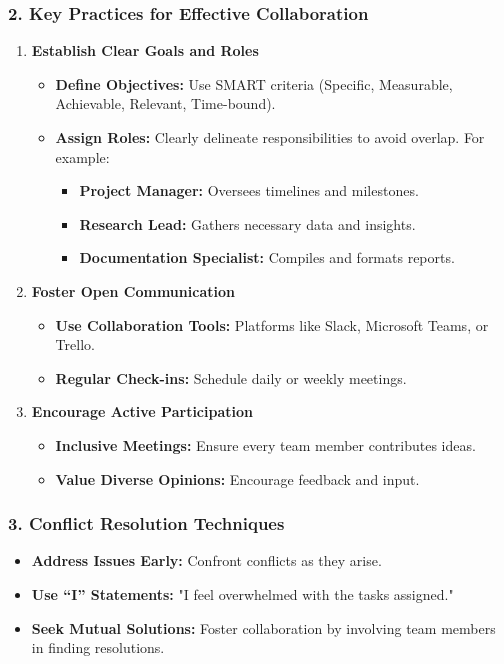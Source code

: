 \documentclass[aspectratio=169]{beamer}
\begin{document}
\begin{frame}[fragile]
    \frametitle{2. Key Practices for Effective Collaboration}
    \begin{enumerate}
        \item \textbf{Establish Clear Goals and Roles}
        \begin{itemize}
            \item \textbf{Define Objectives:} Use SMART criteria (Specific, Measurable, Achievable, Relevant, Time-bound).
            \item \textbf{Assign Roles:} Clearly delineate responsibilities to avoid overlap. For example:
            \begin{itemize}
                \item \textbf{Project Manager:} Oversees timelines and milestones.
                \item \textbf{Research Lead:} Gathers necessary data and insights.
                \item \textbf{Documentation Specialist:} Compiles and formats reports.
            \end{itemize}
        \end{itemize}

        \item \textbf{Foster Open Communication}
        \begin{itemize}
            \item \textbf{Use Collaboration Tools:} Platforms like Slack, Microsoft Teams, or Trello.
            \item \textbf{Regular Check-ins:} Schedule daily or weekly meetings.
        \end{itemize}

        \item \textbf{Encourage Active Participation}
        \begin{itemize}
            \item \textbf{Inclusive Meetings:} Ensure every team member contributes ideas.
            \item \textbf{Value Diverse Opinions:} Encourage feedback and input.
        \end{itemize}
    \end{enumerate}
\end{frame}

\begin{frame}[fragile]
    \frametitle{3. Conflict Resolution Techniques}
    \begin{itemize}
        \item \textbf{Address Issues Early:} Confront conflicts as they arise.
        \item \textbf{Use “I” Statements:} "I feel overwhelmed with the tasks assigned."
        \item \textbf{Seek Mutual Solutions:} Foster collaboration by involving team members in finding resolutions.
    \end{itemize}
\end{frame}
\end{document}
